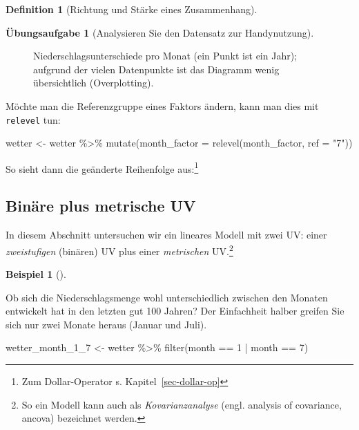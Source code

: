 \documentclass[
  a4paper,
  DIV=11]{scrreprt}
\newenvironment{Shaded}{\begin{snugshade}}{\end{snugshade}}
\newcommand{\AttributeTok}[1]{\textcolor[rgb]{0.40,0.45,0.13}{#1}}
\newcommand{\DecValTok}[1]{\textcolor[rgb]{0.68,0.00,0.00}{#1}}
\newcommand{\DocumentationTok}[1]{\textcolor[rgb]{0.37,0.37,0.37}{\textit{#1}}}
\newcommand{\FunctionTok}[1]{\textcolor[rgb]{0.28,0.35,0.67}{#1}}
\newcommand{\NormalTok}[1]{\textcolor[rgb]{0.00,0.23,0.31}{#1}}
\newcommand{\OtherTok}[1]{\textcolor[rgb]{0.00,0.23,0.31}{#1}}
\newcommand{\SpecialCharTok}[1]{\textcolor[rgb]{0.37,0.37,0.37}{#1}}
\newcommand{\StringTok}[1]{\textcolor[rgb]{0.13,0.47,0.30}{#1}}
\theoremstyle{definition}
\newtheorem{exercise}{Übungsaufgabe}[chapter]
\theoremstyle{definition}
\newtheorem{example}{Beispiel}[chapter]
\theoremstyle{definition}
\newtheorem{definition}{Definition}[chapter]
\theoremstyle{remark}
\begin{document}
\begin{definition}[Richtung und Stärke eines
Zusammenhang]
\begin{exercise}[Analysieren Sie den Datensatz zur
Handynutzung]
\begin{figure}
\caption{\label{fig-wetter-month}Niederschlagsunterschiede pro Monat
(ein Punkt ist ein Jahr); aufgrund der vielen Datenpunkte ist das
Diagramm wenig übersichtlich (Overplotting).}

\end{figure}%

Möchte man die Referenzgruppe eines Faktors ändern, kann man dies mit
\texttt{relevel} tun:

\begin{Shaded}
\begin{Highlighting}[]
\NormalTok{wetter }\OtherTok{\textless{}{-}}
\NormalTok{  wetter }\SpecialCharTok{\%\textgreater{}\%} 
  \FunctionTok{mutate}\NormalTok{(}\AttributeTok{month\_factor =} \FunctionTok{relevel}\NormalTok{(month\_factor, }\AttributeTok{ref =} \StringTok{"7"}\NormalTok{))}
\end{Highlighting}
\end{Shaded}

So sieht dann die geänderte Reihenfolge aus:\footnote{Zum
  Dollar-Operator s. Kapitel~\ref{sec-dollar-op}}

\begin{Shaded}
\end{Shaded}

\subsection{Binäre plus metrische UV}\label{sec-faktorvar}

In diesem Abschnitt untersuchen wir ein lineares Modell mit zwei UV:
einer \emph{zweistufigen} (binären) UV plus einer \emph{metrischen}
UV.\footnote{So ein Modell kann auch als \emph{Kovarianzanalyse} (engl.
  analysis of covariance, ancova) bezeichnet werden.}

\begin{example}[]\protect\hypertarget{exm-rain1}{}\label{exm-rain1}

Ob sich die Niederschlagsmenge wohl unterschiedlich zwischen den Monaten
entwickelt hat in den letzten gut 100 Jahren? Der Einfachheit halber
greifen Sie sich nur zwei Monate heraus (Januar und Juli).

\begin{Shaded}
\begin{Highlighting}[]
\NormalTok{wetter\_month\_1\_7 }\OtherTok{\textless{}{-}}
\NormalTok{  wetter }\SpecialCharTok{\%\textgreater{}\%} 
  \FunctionTok{filter}\NormalTok{(month }\SpecialCharTok{==} \DecValTok{1}  \SpecialCharTok{|}\NormalTok{ month }\SpecialCharTok{==} \DecValTok{7}\NormalTok{) }
\end{Highlighting}
\end{Shaded}


\end{example}
\end{exercise}
\end{definition}
\end{document}
